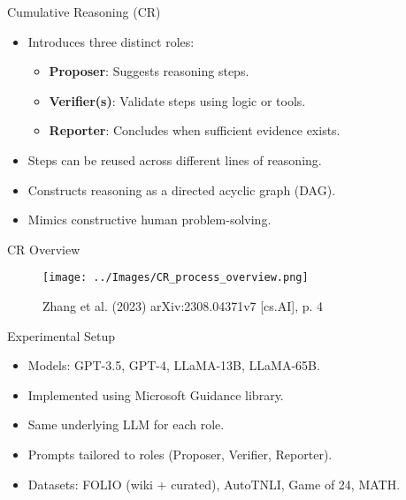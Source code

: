 \documentclass{beamer}
\begin{document}
\begin{frame}{Cumulative Reasoning (CR)}
    \begin{itemize}
        \item Introduces three distinct roles:
              \begin{itemize}
                  \item \textbf{Proposer}: Suggests reasoning steps.
                  \item \textbf{Verifier(s)}: Validate steps using logic or tools.
                  \item \textbf{Reporter}: Concludes when sufficient evidence exists.
              \end{itemize}
        \item Steps can be reused across different lines of reasoning.
        \item Constructs reasoning as a directed acyclic graph (DAG).
        \item Mimics constructive human problem-solving.
    \end{itemize}
\end{frame}


\begin{frame}{CR Overview}
    \begin{figure}
        \centering
        \texttt{[image: ../Images/CR\_process\_overview.png]}

        \vspace{0.5em}
        {\tiny Zhang et al. (2023) arXiv:2308.04371v7 [cs.AI], p. 4}
    \end{figure}
\end{frame}


\begin{frame}{Experimental Setup}
    \begin{itemize}
        \item Models: GPT-3.5, GPT-4, LLaMA-13B, LLaMA-65B.
        \item Implemented using Microsoft Guidance library.
        \item Same underlying LLM for each role.
        \item Prompts tailored to roles (Proposer, Verifier, Reporter).
        \item Datasets: FOLIO (wiki + curated), AutoTNLI, Game of 24, MATH.
    \end{itemize}
\end{frame}
\end{document}
